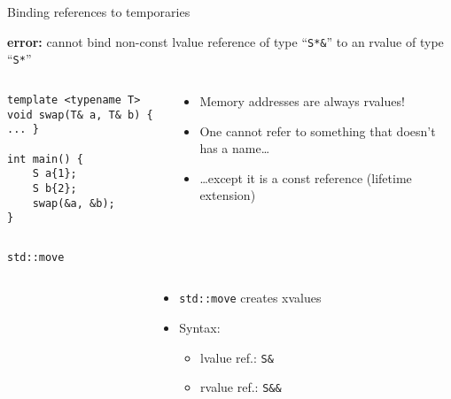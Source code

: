 \begin{frame}[fragile]{Binding references to temporaries}
    \begin{center}
        \textbf{\textcolor{vertexDarkRed}{error:}} cannot bind non-const lvalue reference of type \enquote{\texttt{S*\&}} to an rvalue of type \enquote{\texttt{S*}}
    \end{center}
    \begin{columns}
        \begin{column}{.4\textwidth}
            \begin{lstlisting}
template <typename T>
void swap(T& a, T& b) { ... }

int main() {
    S a{1};
    S b{2};
    swap(&a, &b);
}
            \end{lstlisting}
        \end{column}
        \begin{column}{.55\textwidth}
            \begin{itemize}
                \item Memory addresses are always rvalues!
                \item One cannot refer to something that doesn't has a name\ldots
                \item \ldots except it is a const reference (lifetime extension)
            \end{itemize}
        \end{column}
    \end{columns}
\end{frame}

\begin{frame}
    \centering
\end{frame}

\begin{frame}[fragile]{\texttt{std::move}}
    \begin{columns}
        \begin{column}{.55\textwidth}
        \end{column}
        \begin{column}{.4\textwidth}
            \begin{itemize}
                \item \texttt{std::move} creates xvalues
                \item Syntax:
                \begin{itemize}
                    \item lvalue ref.: \texttt{S\&}
                    \item rvalue ref.: \texttt{S\&\&}
                \end{itemize}
            \end{itemize}
        \end{column}
    \end{columns}
\end{frame}

